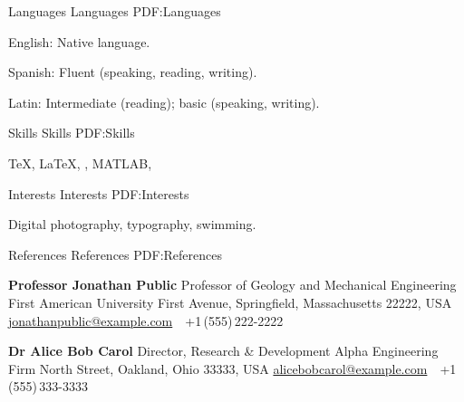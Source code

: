 \documentclass[letterpaper,MMMyyyy,nonstopmode]{simpleresumecv}
\begin{document}
\begin{Body}

  \Section
  {Languages}
  {Languages}
  {PDF:Languages}

  \BulletItem
    English: Native language.

  \Gap
    \BulletItem
      Spanish: Fluent (speaking, reading, writing).

  \Gap
    \BulletItem
      Latin: Intermediate (reading); basic (speaking, writing).


  \Section
  {Skills}
  {Skills}
  {PDF:Skills}

  \Entry
    {\TeX}, {\LaTeX}, {\XeLaTeX},
    MATLAB,
    


  \Section
  {Interests}
  {Interests}
  {PDF:Interests}

  \Entry
    Digital photography,
    typography,
    swimming.


  \Section
  {References}
  {References}
  {PDF:References}

  \BulletItem
    \textbf{Professor Jonathan Public}
    \newline
    Professor of Geology and Mechanical Engineering
    \newline
    First American University
     First Avenue, Springfield, Massachusetts 22222, USA
    \newline
    \href{mailto:jonathanpublic@example.com}
    {jonathanpublic@example.com}
    \,\SubBulletSymbol\,
    +1\,(555)\,222-2222

  \BigGap
    \BulletItem
      \textbf{Dr Alice Bob Carol}
      \newline
      Director, Research \& Development
      \newline
      Alpha Engineering Firm
       North Street, Oakland, Ohio 33333, USA
      \newline
      \href{mailto:alicebobcarol@example.com}
      {alicebobcarol@example.com}
      \,\SubBulletSymbol\,
      +1\,(555)\,333-3333

\end{Body}
\end{document}
